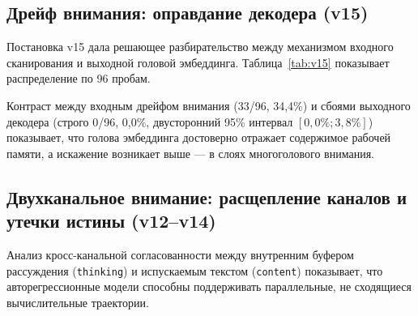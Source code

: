 \documentclass[11pt,a4paper]{article}
\begin{document}
\subsection{Дрейф внимания: оправдание декодера (v15)}

Постановка v15 дала решающее разбирательство между механизмом входного сканирования и выходной головой эмбеддинга. Таблица~\ref{tab:v15} показывает распределение по 96 пробам.

\begin{table}[h!]
\centering
\small
{}%
\caption{Распределение исходов в Argon v15 ($N=96$, алгебраический усилитель $10N - 6$).}
\label{tab:v15}
\end{table}

Контраст между входным дрейфом внимания (33/96, 34{,}4\%) и сбоями выходного декодера (строго 0/96, 0{,}0\%, двусторонний 95\% интервал $[0{,}0\%; 3{,}8\%]$) показывает, что голова эмбеддинга достоверно отражает содержимое рабочей памяти, а искажение возникает выше — в слоях многоголового внимания.

\subsection{Двухканальное внимание: расщепление каналов и утечки истины (v12--v14)}
\label{sec:dual_path}

Анализ кросс-канальной согласованности между внутренним буфером рассуждения (\texttt{thinking}) и испускаемым текстом (\texttt{content}) показывает, что авторегрессионные модели способны поддерживать параллельные, не сходящиеся вычислительные траектории.
\end{document}
